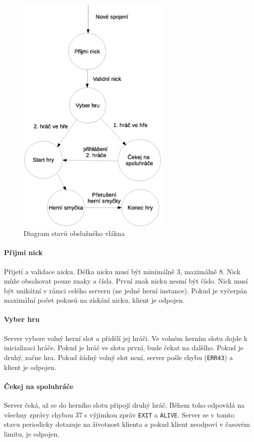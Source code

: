 \documentclass[11pt,a4paper]{scrartcl}
\begin{document}
	\begin{figure} [H]
		\centering
		\includegraphics[height=12cm]{obsluha.eps}
		\caption{Diagram stavů obslužného vlákna}
	\end{figure}

	\paragraph{Přijmi nick}
	Přijetí a validace nicku. Délka nicku musí být minimálně 3, maximálně 8. Nick může obsahovat pouze znaky a čísla. První znak nicku nesmí být číslo. Nick musí být unikátní v rámci celého serveru (ne jedné herní instance). Pokud je vyčerpán maximální počet pokusů na získání nicku, klient je odpojen.
	
	\paragraph{Vyber hru}
	Server vybere volný herní slot a přidělí jej hráči. Ve volném herním slotu dojde k inicializaci hráče. Pokud je hráč ve slotu první, bude čekat na dalšího. Pokud je druhý, začne hra. Pokud žádný volný slot není, server pošle chybu (\verb|ERR43|) a klient je odpojen.

	\paragraph{Čekej na spoluhráče}	
	Server čeká, až se do herního slotu připojí druhý hráč. Během toho odpovídá na všechny zprávy chybou 37 s výjimkou zpráv \verb|EXIT| a \verb|ALIVE|. Server se v tomto stavu periodicky dotazuje na životnost klienta a pokud klient neodpoví v časovém limitu, je odpojen.
\end{document}

